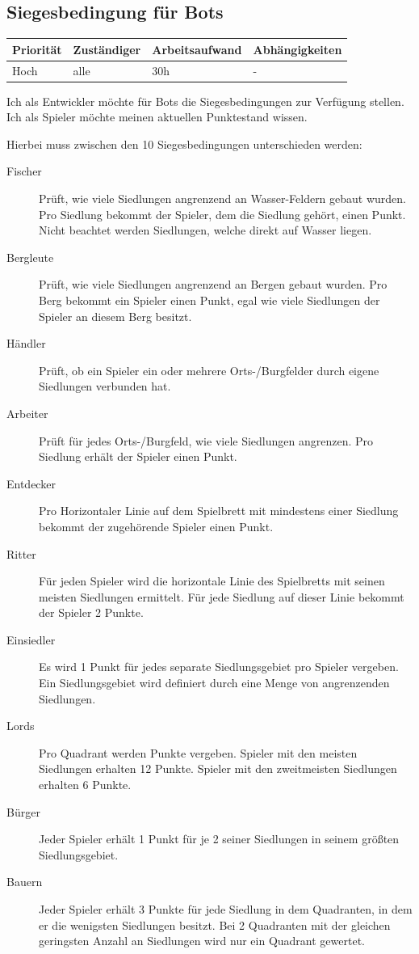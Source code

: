\documentclass[a4paper]{scrreprt}
\newenvironment{requirement}[5] {
	\subsection{#1}
	\begin{tabularx}{\textwidth}{|X|l|X|X|}
		\hline
		Priorität & Zuständiger & Arbeitsaufwand & Abhängigkeiten \\
		\hline
		#2 & #3 & #4 & #5 \\
		\hline
	\end{tabularx}
	}{
	\newpage
	}
\begin{document}
\begin{requirement}{Siegesbedingung für Bots}{Hoch}{alle}{30h}{-}

\begin{center}
Ich als Entwickler möchte für Bots die Siegesbedingungen zur Verfügung stellen.
Ich als Spieler möchte meinen aktuellen Punktestand wissen.
\end{center}

Hierbei muss zwischen den 10 Siegesbedingungen unterschieden werden:
\begin{description}
	\item[Fischer] Prüft, wie viele Siedlungen angrenzend an Wasser-Feldern gebaut wurden. Pro Siedlung bekommt der Spieler, dem die Siedlung gehört, einen Punkt. Nicht beachtet werden Siedlungen, welche direkt auf Wasser liegen.
	\item[Bergleute] Prüft, wie viele Siedlungen angrenzend an Bergen gebaut wurden. Pro Berg bekommt ein Spieler einen Punkt, egal wie viele Siedlungen der Spieler an diesem Berg besitzt.
	\item[Händler] Prüft, ob ein Spieler ein oder mehrere Orts-/Burgfelder durch eigene Siedlungen verbunden hat.
	\item[Arbeiter] Prüft für jedes Orts-/Burgfeld, wie viele Siedlungen angrenzen. Pro Siedlung erhält der Spieler einen Punkt.
	\item[Entdecker] Pro Horizontaler Linie auf dem Spielbrett mit mindestens einer Siedlung bekommt der zugehörende Spieler einen Punkt.
	\item[Ritter]  Für jeden Spieler wird die horizontale Linie des Spielbretts mit seinen meisten Siedlungen ermittelt. Für jede Siedlung auf dieser Linie bekommt der Spieler 2 Punkte.
	\item[Einsiedler] Es wird 1 Punkt für jedes separate Siedlungsgebiet pro Spieler vergeben. Ein Siedlungsgebiet wird definiert durch eine Menge von angrenzenden Siedlungen.
	\item[Lords] Pro Quadrant werden Punkte vergeben. Spieler mit den meisten Siedlungen erhalten 12 Punkte. Spieler mit den zweitmeisten Siedlungen erhalten 6 Punkte.
	\item[Bürger] Jeder Spieler erhält 1 Punkt für je 2 seiner Siedlungen in seinem größten Siedlungsgebiet.
	\item[Bauern] Jeder Spieler erhält 3 Punkte für jede Siedlung in dem Quadranten, in dem er die wenigsten Siedlungen besitzt. Bei 2 Quadranten mit der gleichen geringsten Anzahl an Siedlungen wird nur ein Quadrant gewertet.

\end{description}

\end{requirement}
\end{document}

